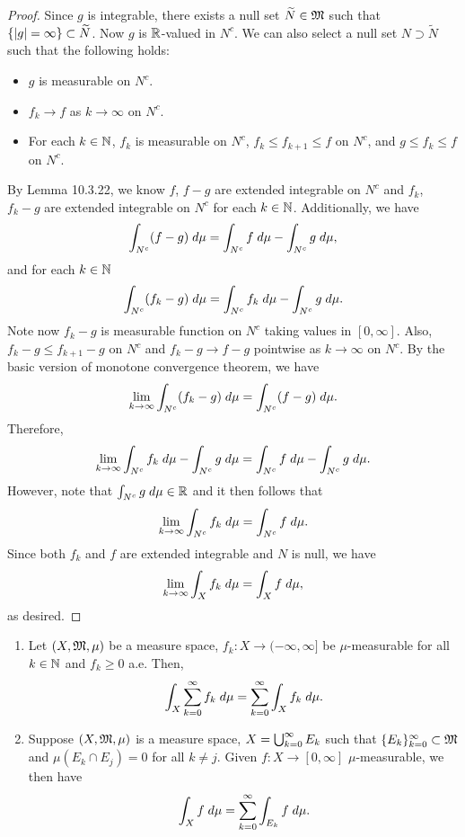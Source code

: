 \documentclass[a4paper]{article}
\begin{document}
\begin{proof}
Since $g$ is integrable, there exists a null set $\widetilde{N} \in \mathfrak{M}$
such that $\left\{ \left\lvert g\right\rvert = \infty \right\} \subset \widetilde{N}$.
Now $g$ is $\mathbb{R}$-valued in $N^c$.
We can also select a null set $N \supset \tilde{N}$
such that the following holds: 
\begin{itemize}
  \item $g$ is measurable on $N^c$.
  \item $f_k \to f$ as $k \to \infty$ on $N^c$.
  \item For each $k \in \mathbb{N}$, $f_k$ is measurable
  on $N^c$, $f_k \leq f_{k+1} \leq f$ on $N^c$, and 
  $g \leq f_k \leq f$ on $N^c$.
\end{itemize}
By Lemma 10.3.22, we know $f$, $f - g$ are extended 
integrable on $N^c$ and $f_k$, $f_k - g$ are extended integrable
on $N^c$ for each $k \in \mathbb{N}$. Additionally, we have 
\[
\int_{N^c} (f - g) \; d \mu = \int_{N^c} f \; d \mu - \int_{N^c}
g \; d \mu,
\]
and for each $k \in \mathbb{N}$ 
\[
\int_{N^c} (f_k - g) \; d \mu = \int_{N^c} f_k \; d \mu
- \int_{N^c} g \; d \mu.
\]
Note now $f_k - g$ is measurable function on $N^c$
taking values in $[0, \infty]$. Also, 
$f_k - g \leq f_{k+1} - g$ on $N^c$ and $f_k - g \to f - g$
pointwise as $k \to \infty$ on $N^c$. By the basic version 
of monotone convergence theorem, we have 
\[
\lim_{k \to \infty} \int_{N^c} (f_k - g) \; d \mu 
= \int_{N^c} (f - g) \; d \mu.
\]
Therefore, 
\[
\lim_{k \to \infty} \int_{N^c} f_k \; d \mu
- \int_{N^c} g \; d \mu = \int_{N^c} f \; d \mu
- \int_{N^c} g \; d \mu.
\]
However, note that $\int_{N^c} g \; d \mu \in \mathbb{R}$
and it then follows that
\[
\lim_{k \to \infty} \int_{N^c} f_k \; d \mu = 
\int_{N^c} f \; d \mu.
\]
Since both $f_k$ and $f$ are extended integrable and 
$N$ is null, we have 
\[
\lim_{k \to \infty} \int_X f_k \; d \mu = \int_X f \; d \mu,
\]
as desired.

\end{proof}

\begin{cor}
\begin{enumerate}
  \item Let $(X, \mathfrak{M}, \mu)$ be a measure space, $f_k : X \to (-\infty, \infty]$
  be $\mu$-measurable for all $k \in \mathbb{N}$ and $f_k \geq 0$ a.e. 
  Then, 
  \[
  \int_X \sum_{k=0}^\infty f_k \; d \mu = \sum_{k=0}^\infty \int_X f_k \; d \mu.
  \]
  
  \item Suppose $(X, \mathfrak{M}, \mu)$ is a measure space, $X = \bigcup_{k=0}^\infty E_k$
  such that $\{ E_k \}_{k=0}^\infty \subset \mathfrak{M}$ and $\mu \left( E_k \cap E_j \right)
  = 0$ for all $k \neq j$. Given $f: X \to [0, \infty]$
  $\mu$-measurable, we then have 
  \[
  \int_X f \; d \mu = \sum_{k=0}^\infty \int_{E_k} f \; d \mu.
  \]
\end{enumerate}
\end{cor}
\end{document}
